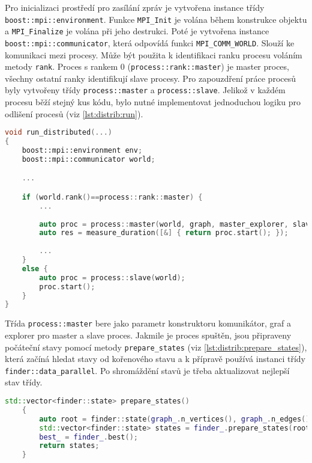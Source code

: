 Pro inicializaci prostředí pro zasílání zpráv je vytvořena instance třídy \texttt{boost::mpi::environment}.
Funkce \texttt{MPI\_Init} je volána během konstrukce objektu a \texttt{MPI\_Finalize} je volána při jeho destrukci.
Poté je vytvořena instance \texttt{boost::mpi::communicator}, která odpovídá funkci \texttt{MPI\_COMM\_WORLD}.
Slouží ke komunikaci mezi procesy.
Může být použita k identifikaci ranku procesu voláním metody \texttt{rank}.
Proces s rankem 0 (\texttt{process::rank::master}) je master proces, všechny ostatní ranky identifikují slave procesy.
Pro zapouzdření práce procesů byly vytvořeny třídy \texttt{process::master} a \texttt{process::slave}.
Jelikož v každém procesu běží stejný kus kódu, bylo nutné implementovat jednoduchou logiku pro odlišení procesů (viz \ref{lst:distrib:run}).

\begin{lstlisting}[language=C++, label={lst:distrib:run}, title={Rozdělení procesů}]
void run_distributed(...)
{
    boost::mpi::environment env;
    boost::mpi::communicator world;

    ...

    if (world.rank()==process::rank::master) {
        ...
        
        auto proc = process::master(world, graph, master_explorer, slave_explorer);
        auto res = measure_duration([&] { return proc.start(); });
        
        ...
    }
    else {
        auto proc = process::slave(world);
        proc.start();
    }
}
\end{lstlisting}

Třída \texttt{process::master} bere jako parametr konstruktoru komunikátor, graf a explorer pro master a slave proces.
Jakmile je proces spuštěn, jsou připraveny počáteční stavy pomocí metody \texttt{prepare\_states} (viz \ref{lst:distrib:prepare_states}), která začíná hledat stavy od kořenového stavu a k přípravě používá instanci třídy \texttt{finder::data\_parallel}.
Po shromáždění stavů je třeba aktualizovat nejlepší stav třídy.

\begin{lstlisting}[language=C++, label={lst:distrib:prepare_states}, title={Metoda pro přípravu počátečních stavů}]
    std::vector<finder::state> prepare_states()
    {
        auto root = finder::state(graph_.n_vertices(), graph_.n_edges());
        std::vector<finder::state> states = finder_.prepare_states(root);
        best_ = finder_.best();
        return states;
    }
\end{lstlisting}

